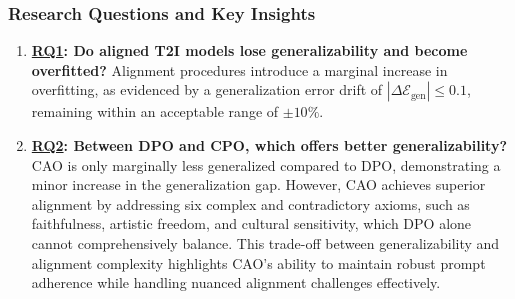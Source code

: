 \subsubsection*{Research Questions and Key Insights}
\begin{enumerate}
    \item \textbf{\ul{RQ1}: Do aligned T2I models lose generalizability and become overfitted?}  
    Alignment procedures introduce a marginal increase in overfitting, as evidenced by a generalization error drift of \(|\Delta \mathcal{E}_{\text{gen}}| \leq 0.1\), remaining within an acceptable range of \(\pm 10\%\).

    \item \textbf{\ul{RQ2}: Between DPO and CPO, which offers better generalizability?}  
    CAO is only marginally less generalized compared to DPO, demonstrating a minor increase in the generalization gap. However, CAO achieves superior alignment by addressing six complex and contradictory axioms, such as faithfulness, artistic freedom, and cultural sensitivity, which DPO alone cannot comprehensively balance. This trade-off between generalizability and alignment complexity highlights CAO's ability to maintain robust prompt adherence while handling nuanced alignment challenges effectively.
\end{enumerate}




